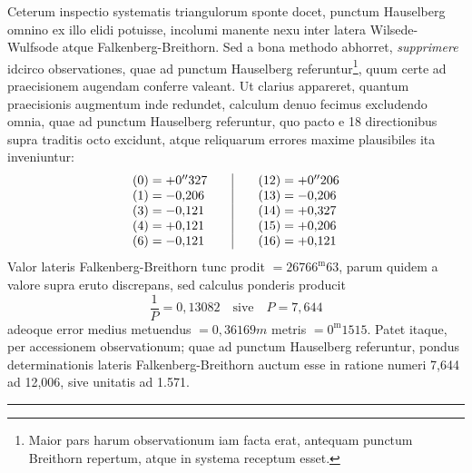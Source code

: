 Ceterum inspectio systematis triangulorum sponte docet, punctum Hauselberg omnino ex illo elidi potuisse, incolumi manente nexu inter latera Wilsede-Wulfsode atque Falkenberg-Breithorn. Sed a bona methodo abhorret, \textit{supprimere} idcirco observationes, quae ad punctum Hauselberg referuntur\footnote{Maior pars harum observationum iam facta erat, antequam punctum Breithorn repertum, atque in systema receptum esset.}, quum certe ad praecisionem augendam conferre valeant. Ut clarius appareret, quantum praecisionis augmentum inde redundet, calculum denuo fecimus excludendo omnia, quae ad punctum Hauselberg referuntur, quo pacto e 18 directionibus supra traditis octo excidunt, atque reliquarum errores maxime plausibiles ita inveniuntur:
\[
\begin{array}{r@{\;}l@{\qquad}|@{\qquad}r@{\;}l}
(0)=&+0''327&(12)=&+0''206\\
(1)=&-0{,}206&(13)=&-0{,}206\\
(3)=&-0{,}121&(14)=&+0{,}327\\
(4)=&+0{,}121&(15)=&+0{,}206\\
(6)=&-0{,}121&(16)=&+0{,}121
\end{array}
\]
Valor lateris Falkenberg-Breithorn tunc prodit \(=26766^{\mathrm m}63\), parum quidem a valore supra eruto discrepans, sed calculus ponderis producit
\[
\frac1P=0{,}13082\quad\text{sive}\quad P=7{,}644
\]
adeoque error medius metuendus \(=0{,}36169m\) metris \(=0^{\mathrm m}1515\). Patet itaque, per accessionem observationum; quae ad punctum Hauselberg referuntur, pondus determinationis lateris Falkenberg-Breithorn auctum esse in ratione numeri 7,644 ad 12,006, sive unitatis ad 1.571.
\par\medskip\begin{center}\rule{.28\textwidth}{.3pt}\end{center}

